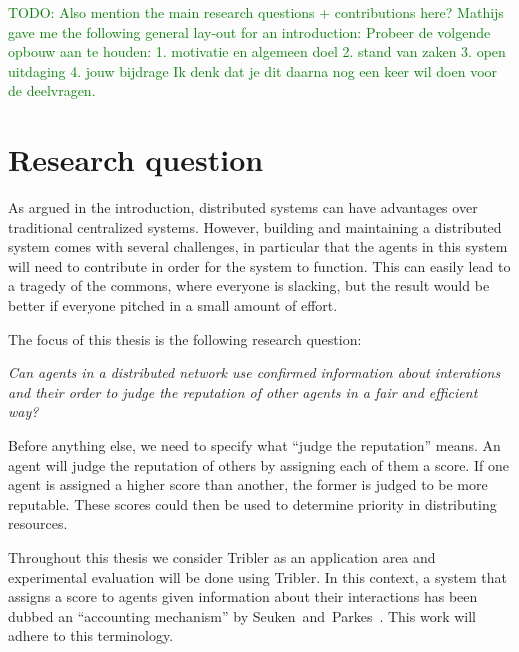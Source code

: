 \documentclass[a4paper,11pt]{book}
\newcommand\suggestion[1]{\textcolor{green}{TODO: #1}}
\theoremstyle{definition}
\begin{document}
\suggestion{Also mention the main research questions + contributions here? Mathijs gave me the following general lay-out
for an introduction: Probeer de volgende opbouw aan te houden:  1. motivatie en algemeen doel 2. stand van zaken 3. open
uitdaging 4. jouw bijdrage Ik denk dat je dit daarna nog een keer wil doen voor de deelvragen.}


\chapter{Research question}
\label{chap:research_questions}

As argued in the introduction, distributed systems can have advantages over traditional centralized
systems. However, building and maintaining a distributed system comes with several challenges, in particular that
the agents in this system will need to contribute in order for the system to
function. This can easily lead to a tragedy of the commons, where everyone is slacking,
but the result would be better if everyone pitched in a small amount of effort.

The focus of this thesis is the following research question:
\begin{center}
    \emph{Can agents in a distributed network use confirmed information about
    interations and their order to judge the reputation of other agents
in a fair and efficient way?}
\end{center}


Before anything else, we need to specify what ``judge the reputation'' means.
An agent will judge the reputation of others by assigning each of them a score.
If one agent is assigned a higher score than another, the former is judged to be more
reputable.  These scores could then be used to determine priority in distributing resources.

Throughout this thesis we consider Tribler as an application area and experimental
evaluation will be done using Tribler. 
In this context, a system that assigns a score
to agents given information about their interactions has been dubbed an 
``accounting mechanism'' by Seuken~and~Parkes~\cite{seuken2010accounting}. This
work will adhere to this terminology.
\end{document}
